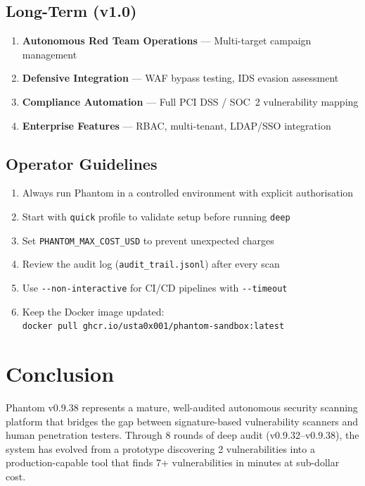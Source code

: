 \documentclass[11pt,a4paper]{article}
\begin{document}
\subsection{Long-Term (v1.0)}
\begin{enumerate}[noitemsep]
  \item \textbf{Autonomous Red Team Operations} --- Multi-target campaign management
  \item \textbf{Defensive Integration} --- WAF bypass testing, IDS evasion assessment
  \item \textbf{Compliance Automation} --- Full PCI DSS / SOC~2 vulnerability mapping
  \item \textbf{Enterprise Features} --- RBAC, multi-tenant, LDAP/SSO integration
\end{enumerate}

\subsection{Operator Guidelines}
\begin{enumerate}[noitemsep]
  \item Always run Phantom in a controlled environment with explicit authorisation
  \item Start with \texttt{quick} profile to validate setup before running \texttt{deep}
  \item Set \texttt{PHANTOM\_MAX\_COST\_USD} to prevent unexpected charges
  \item Review the audit log (\texttt{audit\_trail.jsonl}) after every scan
  \item Use \texttt{-{}-non-interactive} for CI/CD pipelines with \texttt{-{}-timeout}
  \item Keep the Docker image updated:\\
        {\small\texttt{docker pull ghcr.io/usta0x001/phantom-sandbox:latest}}
\end{enumerate}


\section{Conclusion}
\label{sec:conclusion}

Phantom v0.9.38 represents a mature, well-audited autonomous security scanning
platform that bridges the gap between signature-based vulnerability scanners and
human penetration testers. Through 8 rounds of deep audit (v0.9.32--v0.9.38),
the system has evolved from a prototype discovering 2 vulnerabilities into a
production-capable tool that finds 7+ vulnerabilities in minutes at sub-dollar
cost.
\end{document}
